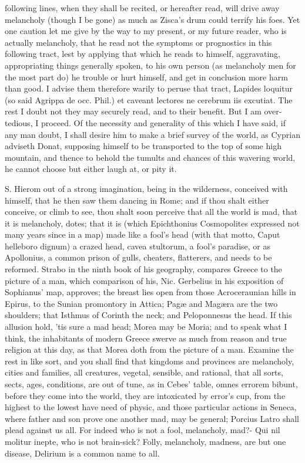 {following lines, when they shall be recited, or hereafter read, will
drive away melancholy (though I be gone) as much as Zisca's drum could
terrify his foes. Yet one caution let me give by the way to my present,
or my future reader, who is actually melancholy, that he read not the
symptoms or prognostics in this following tract, lest by applying
that which he reads to himself, aggravating, appropriating things
generally spoken, to his own person (as melancholy men for the most
part do) he trouble or hurt himself, and get in conclusion more harm
than good. I advise them therefore warily to peruse that tract, Lapides
loquitur (so said Agrippa de occ. Phil.) et caveant lectores ne
cerebrum iis excutiat. The rest I doubt not they may securely read, and
to their benefit. But I am over-tedious, I proceed.
Of the necessity and generality of this which I have said, if any man
doubt, I shall desire him to make a brief survey of the world, as 
Cyprian adviseth Donat, supposing himself to be transported to the top
of some high mountain, and thence to behold the tumults and chances of
this wavering world, he cannot choose but either laugh at, or pity it.

S. Hierom out of a strong imagination, being in the wilderness,
conceived with himself, that he then saw them dancing in Rome; and if
thou shalt either conceive, or climb to see, thou shalt soon perceive
that all the world is mad, that it is melancholy, dotes; that it is
(which Epichthonius Cosmopolites expressed not many years since in a
map) made like a fool's head (with that motto, Caput helleboro dignum)
a crazed head, cavea stultorum, a fool's paradise, or as Apollonius, a
common prison of gulls, cheaters, flatterers, \etc and needs to be
reformed. Strabo in the ninth book of his geography, compares Greece to
the picture of a man, which comparison of his, Nic. Gerbelius in his
exposition of Sophianus' map, approves; the breast lies open from those
Acroceraunian hills in Epirus, to the Sunian promontory in Attica;
Pag\ae{} and Mag\ae{}ra are the two shoulders; that Isthmus of Corinth the
neck; and Peloponnesus the head. If this allusion hold, 'tis sure a mad
head; Morea may be Moria; and to speak what I think, the inhabitants of
modern Greece swerve as much from reason and true religion at this day,
as that Morea doth from the picture of a man. Examine the rest in like
sort, and you shall find that kingdoms and provinces are melancholy,
cities and families, all creatures, vegetal, sensible, and rational,
that all sorts, sects, ages, conditions, are out of tune, as in Cebes'
table, omnes errorem bibunt, before they come into the world, they are
intoxicated by error's cup, from the highest to the lowest have need of
physic, and those particular actions in Seneca, where father and
son prove one another mad, may be general; Porcius Latro shall plead
against us all. For indeed who is not a fool, melancholy, mad?-
Qui nil molitur inepte, who is not brain-sick? Folly, melancholy,
madness, are but one disease, Delirium is a common name to all.

}
